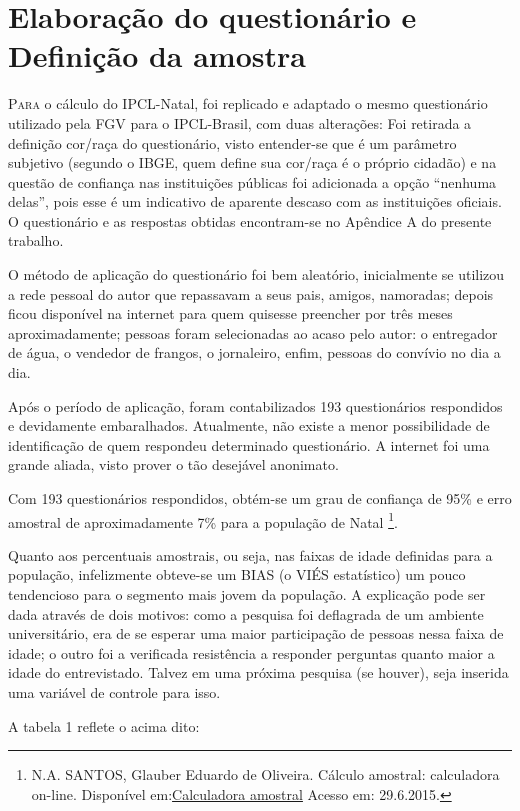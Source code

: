 \documentclass[
	12pt,				%
	openright,			%
	twoside,			%
	a4paper,			%
	chapter=TITLE,		%
	section=TITLE,		%
	subsection=TITLE,	%
	subsubsection=TITLE,%
	spanish,            %
	english,			%
	brazil				%
	]{abntex2}
\begin{document}
\section{Elaboração do questionário e Definição da amostra}
\lettrine[lines=2, lhang=0.33, loversize=0.25]{P}{ara} o cálculo do IPCL-Natal, foi replicado e adaptado o mesmo questionário utilizado pela FGV para o IPCL-Brasil, com duas alterações: Foi retirada
a definição cor/raça do questionário, visto entender-se que é um parâmetro subjetivo (segundo o IBGE, quem define sua cor/raça é o 
próprio cidadão) e na questão de confiança nas instituições públicas foi adicionada a opção “nenhuma delas”, pois esse é um indicativo
de aparente descaso com as instituições oficiais.  O questionário e as respostas obtidas encontram-se no Apêndice A do presente trabalho.
\par
O método de aplicação do questionário foi bem aleatório, inicialmente se utilizou a rede pessoal do autor que repassavam a seus pais, amigos, namoradas;
depois ficou disponível na internet para quem quisesse preencher por três meses aproximadamente; pessoas foram selecionadas ao acaso pelo autor:
o entregador de água, o vendedor de frangos, o jornaleiro, enfim, pessoas do convívio no dia a dia.
\par
Após o período de aplicação, foram contabilizados 193 questionários respondidos e devidamente embaralhados. Atualmente, não existe a menor
possibilidade de identificação de quem respondeu determinado questionário. A internet foi uma grande aliada, visto prover o tão desejável
anonimato.
\par
Com 193 questionários respondidos, obtém-se um grau de confiança de 95\% e erro amostral de aproximadamente 7\% para a população de Natal \footnote{N.A. SANTOS, Glauber Eduardo de Oliveira. Cálculo amostral: calculadora on-line. Disponível em:\href{http://www.calculoamostral.vai.la}{Calculadora amostral} Acesso em: 29.6.2015.}.
\par
Quanto aos percentuais amostrais, ou seja, nas faixas de idade definidas para a população, infelizmente obteve-se um BIAS (o VIÉS estatístico) um pouco tendencioso para o segmento mais jovem da população. A explicação pode ser dada através de dois motivos: como a pesquisa foi deflagrada de um ambiente universitário, era de se esperar uma maior participação de pessoas nessa faixa de idade; o outro foi a verificada resistência a responder perguntas quanto maior a idade do entrevistado. Talvez em uma próxima pesquisa (se houver), seja inserida uma variável de controle para isso.
\par
A tabela 1 reflete o acima dito:
\end{document}
